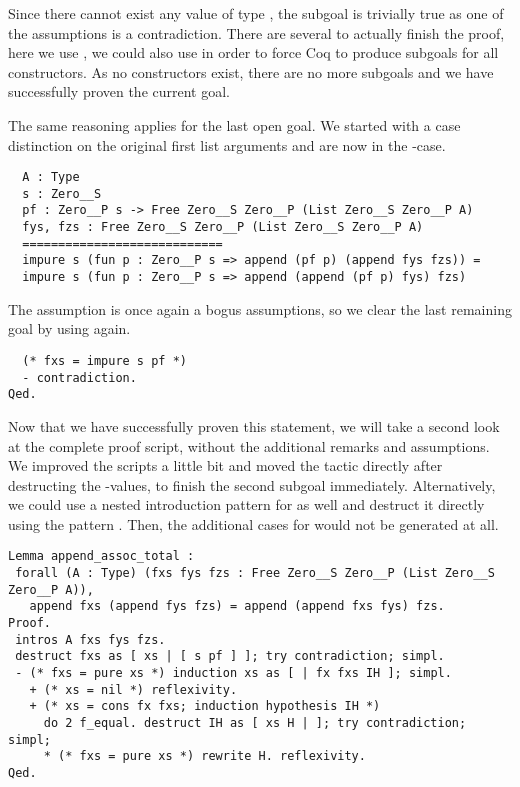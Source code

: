 Since there cannot exist any value of type , the subgoal
is trivially true as one of the assumptions is a contradiction.
There are several to actually finish the proof, here we use
, we could also use  in order to
force Coq to produce subgoals for all constructors.
As no constructors exist, there are no more subgoals and we have
successfully proven the current goal.

The same reasoning applies for the last open goal.
We started with a case distinction on the original first list
arguments  and are now in the -case.

\begin{verbatim}
  A : Type
  s : Zero__S
  pf : Zero__P s -> Free Zero__S Zero__P (List Zero__S Zero__P A)
  fys, fzs : Free Zero__S Zero__P (List Zero__S Zero__P A)
  ============================
  impure s (fun p : Zero__P s => append (pf p) (append fys fzs)) =
  impure s (fun p : Zero__P s => append (append (pf p) fys) fzs)
\end{verbatim}

The assumption  is once again a bogus assumptions,
so we clear the last remaining goal by using  again.

\begin{verbatim}
  (* fxs = impure s pf *)
  - contradiction.
Qed.
\end{verbatim}

Now that we have successfully proven this statement, we will take a
second look at the complete proof script, without the additional
remarks and assumptions.
We improved the scripts a little bit and moved the
 tactic directly after destructing the
-values, to finish the second subgoal immediately.
Alternatively, we could use a nested introduction pattern for
 as well and destruct it directly using the pattern \cinl{[]}.
Then, the additional cases for  would not be generated at
all.

\begin{verbatim}
Lemma append_assoc_total :
 forall (A : Type) (fxs fys fzs : Free Zero__S Zero__P (List Zero__S Zero__P A)),
   append fxs (append fys fzs) = append (append fxs fys) fzs.
Proof.
 intros A fxs fys fzs.
 destruct fxs as [ xs | [ s pf ] ]; try contradiction; simpl.
 - (* fxs = pure xs *) induction xs as [ | fx fxs IH ]; simpl.
   + (* xs = nil *) reflexivity.
   + (* xs = cons fx fxs; induction hypothesis IH *)
     do 2 f_equal. destruct IH as [ xs H | ]; try contradiction; simpl;
     * (* fxs = pure xs *) rewrite H. reflexivity.
Qed.
\end{verbatim}

